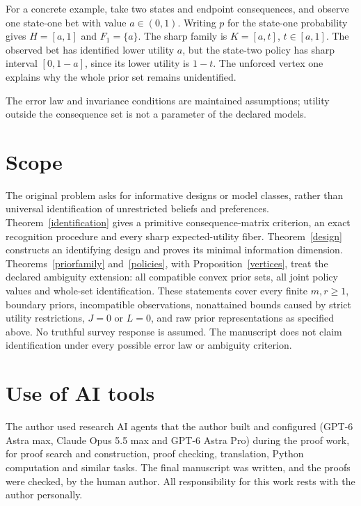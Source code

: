 \documentclass[11pt]{article}
\begin{document}
For a concrete example, take two states and endpoint consequences, and observe one state-one bet with value $a\in(0,1)$. Writing $p$ for the state-one probability gives $H=[a,1]$ and $F_1=\{a\}$. The sharp family is $K=[a,t]$, $t\in[a,1]$. The observed bet has identified lower utility $a$, but the state-two policy has sharp interval $[0,1-a]$, since its lower utility is $1-t$. The unforced vertex one explains why the whole prior set remains unidentified.

The error law and invariance conditions are maintained assumptions; utility outside the consequence set is not a parameter of the declared models.

\section{Scope}
The original problem asks for informative designs or model classes, rather than universal identification of unrestricted beliefs and preferences. Theorem~\ref{identification} gives a primitive consequence-matrix criterion, an exact recognition procedure and every sharp expected-utility fiber. Theorem~\ref{design} constructs an identifying design and proves its minimal information dimension. Theorems~\ref{priorfamily} and~\ref{policies}, with Proposition~\ref{vertices}, treat the declared ambiguity extension: all compatible convex prior sets, all joint policy values and whole-set identification. These statements cover every finite $m,r\ge1$, boundary priors, incompatible observations, nonattained bounds caused by strict utility restrictions, $J=0$ or $L=0$, and raw prior representations as specified above. No truthful survey response is assumed. The manuscript does not claim identification under every possible error law or ambiguity criterion.

\section*{Use of AI tools}
The author used research AI agents that the author built and configured (GPT-6 Astra max,
Claude Opus 5.5 max and GPT-6 Astra Pro) during the proof work, for proof search and
construction, proof checking, translation, Python computation and similar tasks. The final
manuscript was written, and the proofs were checked, by the human author. All responsibility
for this work rests with the author personally.
\end{document}
